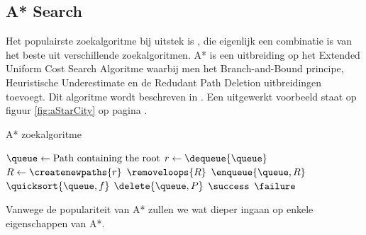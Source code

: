 \subsection{A* Search}
Het populairste zoekalgoritme bij uitstek is , die eigenlijk een combinatie is van het beste uit verschillende zoekalgoritmen. A* is een uitbreiding op het Extended Uniform Cost Search Algoritme waarbij men het Branch-and-Bound principe, Heuristische Underestimate en de Redudant Path Deletion uitbreidingen toevoegt. Dit algoritme wordt beschreven in . Een uitgewerkt voorbeeld staat op figuur \ref{fig:aStarCity} op pagina \pageref{fig:aStarCity}.
\begin{algorithm}[htb]                      %
\caption{A* zoekalgoritme}          %
\label{alg:aStar}                           %
\begin{algorithmic}[1]                    %
\STATE $\queue\leftarrow\mbox{Path containing the root}$
\WHILE{$\notempty{\queue}\wedge\neg\goalreached{\queue\left[0\right]}$}
\STATE $r\leftarrow\dequeue{\queue}$
\STATE $R\leftarrow\createnewpaths{r}$
\STATE $\removeloops{R}$
\STATE $\enqueue{\queue,R}$
\STATE $\quicksort{\queue,f}$
\STATE{}
\STATE $\delete{\queue,P}$
\ENDIF
\ENDFOR
\ENDWHILE
\IF{$\goalreached{\queue\left[0\right]}$}
\RETURN $\success$
\ELSE
\RETURN $\failure$
\ENDIF
\end{algorithmic}
\end{algorithm}
Vanwege de populariteit van A* zullen we wat dieper ingaan op enkele eigenschappen van A*.
